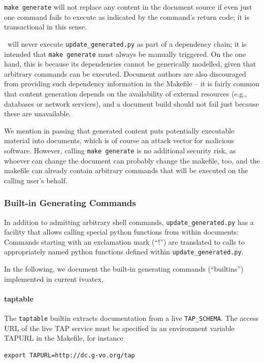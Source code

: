 \documentclass[11pt,a4paper]{ivoa}
\begin{document}
\texttt{make generate} will not replace any content in the document source
if even just one command fails to execute as indicated by the
command's return code; it is transactional in this sense.

\ivoatex~will never execute \texttt{update\_generated.py} as part of a
dependency chain; it is intended that \texttt{make generate} must always
be manually triggered.  On the one hand, this is because its
dependencies cannot be generically modelled, given that arbitrary
commands can be executed.  Document authors are also discouraged from
providing such dependency information in
the Makefile -- it is fairly common that
content generation depends on the availability of external resources
(e.g., databases or network services), and a document build should not
fail just because these are unavailable.

We mention in passing that generated content puts potentially executable
material into documents, which is of course an attack vector for
malicious software.  However, calling \texttt{make generate} is no
additional security risk, as whoever can change the document can
probably change the makefile, too, and the makefile can already contain
arbitrary commands that will be executed on the calling user's behalf.


\subsubsection{Built-in Generating Commands}

In addition to admitting arbitrary shell
commands, \texttt{update\_generated.py} has a facility that allows
calling special python functions from within documents: Commands
starting with an exclamation mark (``!'') are translated to calls to
appropriately named python functions defined within
\texttt{update\_generated.py}.

In the following, we document the built-in generating commands
(``builtins'') implemented in current ivoatex.

\paragraph{taptable}

The \texttt{taptable} builtin extracts documentation from a
live \texttt{TAP\_SCHEMA}.  The access URL of the
live TAP service must be specified in an environment variable TAPURL in
the Makefile, for instance

\begin{lstlisting}
export TAPURL=http://dc.g-vo.org/tap
\end{lstlisting}
\end{document}
